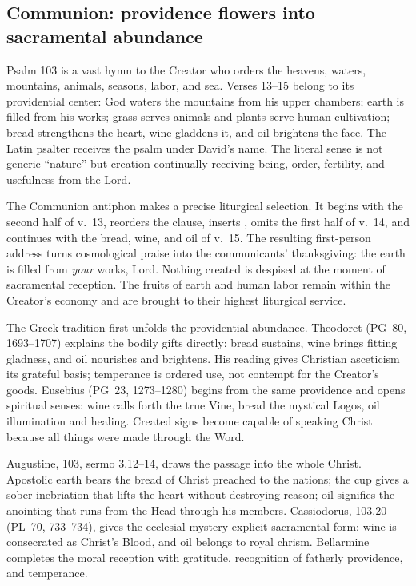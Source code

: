 \elementguard
\subsection*{Communion: providence flowers into sacramental abundance }

Psalm 103 is a vast hymn to the Creator who orders the heavens, waters,
mountains, animals, seasons, labor, and sea. Verses 13--15 belong to its
providential center: God waters the mountains from his upper chambers; earth is
filled from his works; grass serves animals and plants serve human cultivation;
bread strengthens the heart, wine gladdens it, and oil brightens the face. The
Latin psalter receives the psalm under David's name. The literal sense is not
generic ``nature'' but creation continually receiving being, order, fertility,
and usefulness from the Lord.

The Communion antiphon makes a precise liturgical selection. It begins with
the second half of v.~13, reorders the clause, inserts , omits
the first half of v.~14, and continues with the bread, wine, and oil of v.~15.
The resulting first-person address turns cosmological praise into the
communicants' thanksgiving: the earth is filled from \emph{your} works, Lord.
Nothing created is despised at the moment of sacramental reception. The fruits
of earth and human labor remain within the Creator's economy and are brought
to their highest liturgical service.

The Greek tradition first unfolds the providential abundance. Theodoret
(PG~80, 1693--1707) explains the bodily gifts directly: bread sustains, wine
brings fitting gladness, and oil nourishes and brightens. His reading gives
Christian asceticism its grateful basis; temperance is ordered use, not
contempt for the Creator's goods. Eusebius (PG~23, 1273--1280) begins from the
same providence and opens spiritual senses: wine calls forth the true Vine,
bread the mystical Logos, oil illumination and healing. Created signs become
capable of speaking Christ because all things were made through the Word.

Augustine,  103, sermo 3.12--14, draws the passage
into the whole Christ. Apostolic earth bears the bread of Christ preached to
the nations; the cup gives a sober inebriation that lifts the heart without
destroying reason; oil signifies the anointing that runs from the Head through
his members. Cassiodorus,  103.20 (PL~70,
733--734), gives the ecclesial mystery explicit sacramental form: wine is
consecrated as Christ's Blood, and oil belongs to royal chrism. Bellarmine
completes the moral reception with gratitude, recognition of fatherly
providence, and temperance.

